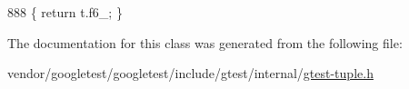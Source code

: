 \begin{DoxyCode}
888                              \{ \textcolor{keywordflow}{return} t.f6\_; \}
\end{DoxyCode}


The documentation for this class was generated from the following file\+:\begin{DoxyCompactItemize}
\item 
vendor/googletest/googletest/include/gtest/internal/\hyperlink{gtest-tuple_8h}{gtest-\/tuple.\+h}\end{DoxyCompactItemize}
